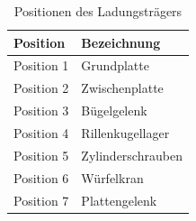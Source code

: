 \documentclass[../../main.tex]{subfiles}
\begin{document}
    \begin{table}[H] \centering
        \begin{tabular}{|l|l|}
        \hline
        \textbf{Position} & \textbf{Bezeichnung}\\
        \hline
        Position 1          & Grundplatte\\
         \hline
        Position 2          & Zwischenplatte\\
        \hline
        Position 3          & Bügelgelenk\\
        \hline
        Position 4          & Rillenkugellager\\
        \hline
        Position 5          & Zylinderschrauben\\
        \hline
        Position 6          & Würfelkran\\
        \hline
        Position 7          & Plattengelenk\\
        \hline
        \end{tabular}
        
        \caption{Positionen des Ladungsträgers}
        \label{tab:pos_ladungstraeger}
        \end{table}
\end{document}
